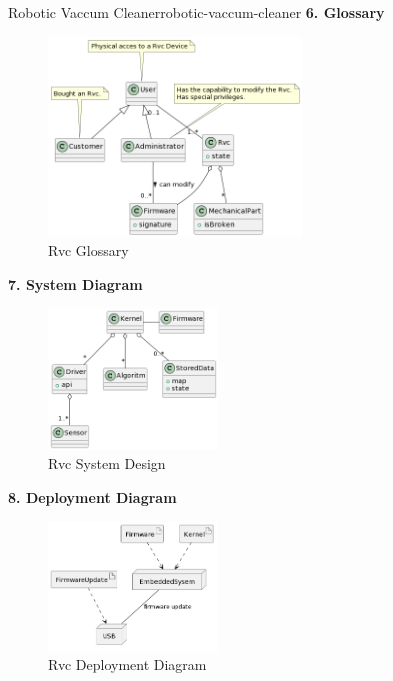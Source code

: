 \documentclass[12pt]{article}
\begin{document}
\begin{example}{Robotic Vaccum Cleaner}{robotic-vaccum-cleaner}
  \textbf{6. Glossary}
  \begin{figure}[H]
    \centering
    \includegraphics[width=0.6\textwidth]{rvc-glossary.png}
    \caption{Rvc Glossary}
    \label{fig:rvc-glossary}
  \end{figure}
  \textbf{7. System Diagram}
  \begin{figure}[H]
    \centering
    \includegraphics[width=0.4\textwidth]{rvc-system-design.png}
    \caption{Rvc System Design}
    \label{fig:rvc-system-design}
  \end{figure}
  \textbf{8. Deployment Diagram}
  \begin{figure}[H]
    \centering
    \includegraphics[width=0.4\textwidth]{rvc-deployment-diagram.png}
    \caption{Rvc Deployment Diagram}
    \label{fig:rvc-deployment-diagram}
  \end{figure}
\end{example}
\end{document}
